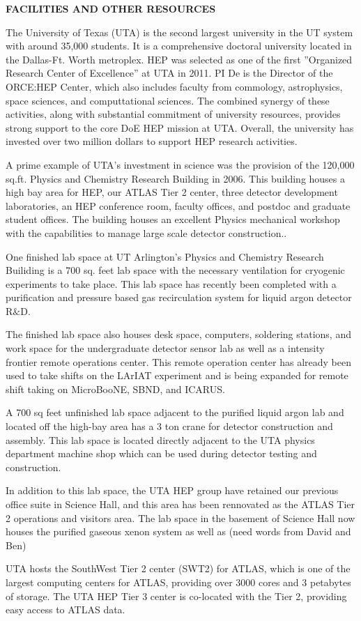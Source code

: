 \begin{center}
{\bf FACILITIES AND OTHER RESOURCES}
\end{center}

The University of Texas (UTA) is the second largest university in the UT system with around 35,000 students. It is a comprehensive doctoral university located in the Dallas-Ft. Worth metroplex. HEP was selected as one of the first ''Organized Research Center of Excellence'' at UTA in 2011. PI De is the Director of the ORCE:HEP Center, which also includes faculty from commology, astrophysics, space sciences, and computtational sciences. The combined synergy of these activities, along with substantial commitment of university resources, provides strong support to the core DoE HEP mission at UTA. Overall, the university has invested over two million dollars to support HEP research activities.

A prime example of UTA's investment in science was the provision of the 120,000 sq.ft. Physics and Chemistry Research Building in 2006.  This building houses a high bay area for HEP, our ATLAS Tier 2 center, three detector development laboratories, an HEP conference room, faculty offices, and postdoc and graduate student offices. The building houses an excellent Physics mechanical workshop with the capabilities to manage large scale detector construction..

One finished lab space at UT Arlington's Physics and Chemistry Research Builiding is a 700 sq. feet lab space with the necessary ventilation for cryogenic experiments to take place. This lab space has recently been completed with a purification and pressure based gas recirculation system for liquid argon detector R$\&$D.

The finished lab space also houses desk space, computers, soldering stations, and work space for the undergraduate detector sensor lab as well as a intensity frontier remote operations center. This remote operation center has already been used to take shifts on the LArIAT experiment and is being expanded for remote shift taking on MicroBooNE, SBND, and ICARUS.

A 700 sq feet unfinished lab space adjacent to the purified liquid argon lab and located off the high-bay area has a 3 ton crane for detector construction and assembly. This lab space is located directly adjacent to the UTA physics department machine shop which can be used during detector testing and construction.

In addition to this lab space, the UTA HEP group have retained our previous office suite in Science Hall, and this area has been rennovated as the ATLAS Tier 2 operations and visitors area. The lab space in the basement of Science Hall now houses the purified gaseous xenon system as well as (need words from David and Ben)

UTA hosts the SouthWest Tier 2 center (SWT2) for ATLAS, which is one of the largest computing centers for ATLAS, providing over 3000 cores and 3 petabytes of storage. The UTA HEP Tier 3 center is co-located with the Tier 2, providing easy access to ATLAS data.
